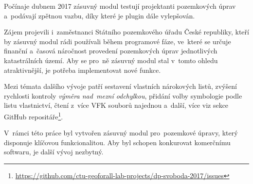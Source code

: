Počínaje dubnem 2017 zásuvný modul testují projektanti pozemkových
úprav a~podávají zpětnou vazbu, díky které je plugin dále vylepšován.

Zájem projevili i~zaměstnanci Státního pozemkového úřadu České
republiky, kteří by zásuvný modul rádi používali během programové
fáze, ve~které se určuje finanční a~časová náročnost provedení
pozemkových úprav jednotlivých katastrálních území. Aby se pro~ně
zásuvný modul stal v~tomto ohledu atraktivnější, je potřeba
implementovat nové funkce.

Mezi témata dalšího vývoje patří sestavení vlastních nárokových listů,
zvýšení rychlosti kontroly \textit{výměra nad~mezní odchylkou},
přidání volby symbologie podle listu vlastnictví, čtení z~více VFK
souborů najednou a~další, více viz sekce GitHub
repositáře\footnote{\url{https://github.com/ctu-geoforall-lab-projects/dp-svoboda-2017/issues}}.

V~rámci této práce byl vytvořen zásuvný modul pro~pozemkové úpravy,
který disponuje klíčovou funkcionalitou. Aby byl schopen konkurovat
komerčnímu softwaru, je další vývoj nezbytný.
